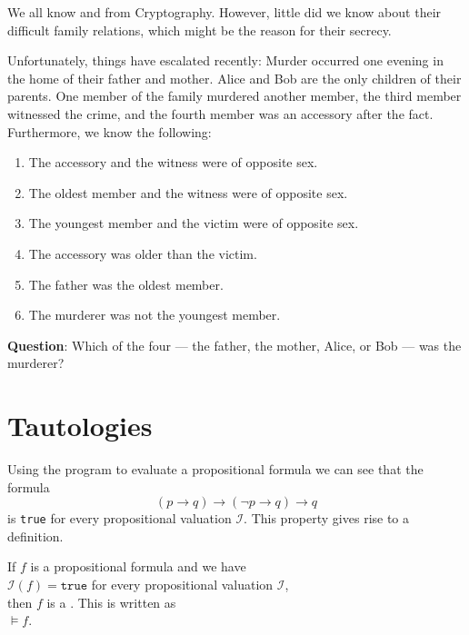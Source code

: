 \begin{center}
\begin{minipage}{0.95\linewidth}
We all know  and  from Cryptography.  However, little did
we know about their difficult family relations, which might be the reason for
their secrecy.  

Unfortunately, things have escalated recently:
Murder occurred one evening in the home of their father and mother.  Alice and Bob are the only children of
their parents. One member of the family murdered another member, the third member witnessed the crime, and the
fourth member was an accessory after the fact.  Furthermore, we know the following: 
\begin{enumerate}
\item The accessory and the witness were of opposite sex.
\item The oldest member and the witness were of opposite sex.
\item The youngest member and the victim were of opposite sex.
\item The accessory was older than the victim.
\item The father was the oldest member.
\item The murderer was not the youngest member.
\end{enumerate}
\textbf{Question}: Which of the four --- the father, the mother, Alice, or Bob --- was the murderer?
\eox
\end{minipage} 
\end{center}

\section{Tautologies}
Using the program to evaluate a propositional formula we can see that the formula
$$  (p \rightarrow q) \rightarrow (\neg p \rightarrow q) \rightarrow q $$
is \texttt{true} for every propositional valuation $\mathcal{I}$.  This property gives rise to a definition.

\begin{Definition}[Tautology]
  If $f$ is a propositional formula and we have
  \\[0.2cm]
  \hspace*{1.3cm}
  $\mathcal{I}(f) = \texttt{true}$ \quad for every propositional valuation $\mathcal{I}$, \\[0.2cm]
  then $f$ is a  .  This is written as \\[0.2cm]
  \hspace*{1.3cm} $\models f$.
  \eox
\end{Definition}

